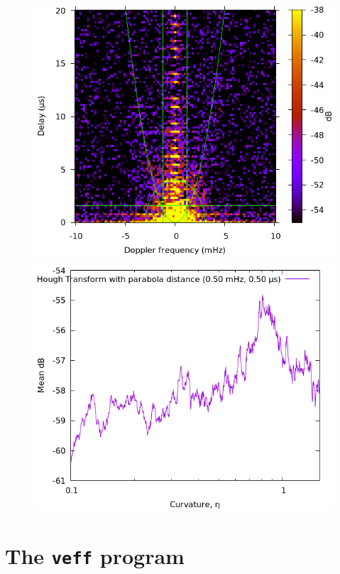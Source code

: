 \documentclass{article}
\newcommand{\veff}{\texttt{veff}}
\begin{document}
\begin{figure}[!ht]
    \centering
    \includegraphics[scale=0.3]{example_ss.png}
    \includegraphics[scale=0.3]{example_hg.png}
\end{figure}

\section{The \veff{} program}
\end{document}
